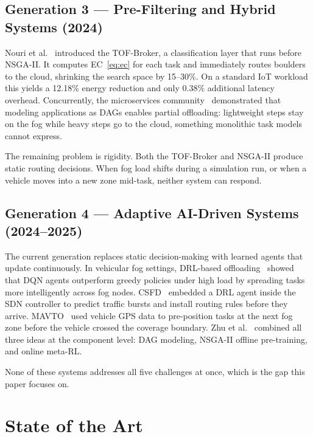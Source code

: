 \documentclass[12pt,a4paper]{article}
\begin{document}
\subsection{Generation 3 --- Pre-Filtering and Hybrid Systems (2024)}

Nouri et al.~\cite{nouri2024tof} introduced the TOF-Broker, a classification
layer that runs before NSGA-II. It computes EC~\eqref{eq:ec} for each task and
immediately routes boulders to the cloud, shrinking the search space by 15--30\%.
On a standard IoT workload this yields a 12.18\% energy reduction and only 0.38\%
additional latency overhead. Concurrently, the microservices
community~\cite{li2025microservice} demonstrated that modeling applications as
DAGs enables partial offloading: lightweight steps stay on the fog while heavy
steps go to the cloud, something monolithic task models cannot express.

The remaining problem is rigidity. Both the TOF-Broker and NSGA-II produce static
routing decisions. When fog load shifts during a simulation run, or when a vehicle
moves into a new zone mid-task, neither system can respond.

\subsection{Generation 4 --- Adaptive AI-Driven Systems (2024--2025)}

The current generation replaces static decision-making with learned agents that
update continuously. In vehicular fog settings, DRL-based
offloading~\cite{vfc_drl2024} showed that DQN agents outperform greedy policies
under high load by spreading tasks more intelligently across fog nodes. CSFD~\cite{csfd2025}
embedded a DRL agent inside the SDN controller to predict traffic bursts and
install routing rules before they arrive. MAVTO~\cite{mavto2024} used vehicle GPS
data to pre-position tasks at the next fog zone before the vehicle crossed the
coverage boundary. Zhu et al.~\cite{zhu2025dag} combined all three ideas at the
component level: DAG modeling, NSGA-II offline pre-training, and online meta-RL.

None of these systems addresses all five challenges at once, which is the gap
this paper focuses on.

\section{State of the Art}
\label{sec:sota}
\end{document}
